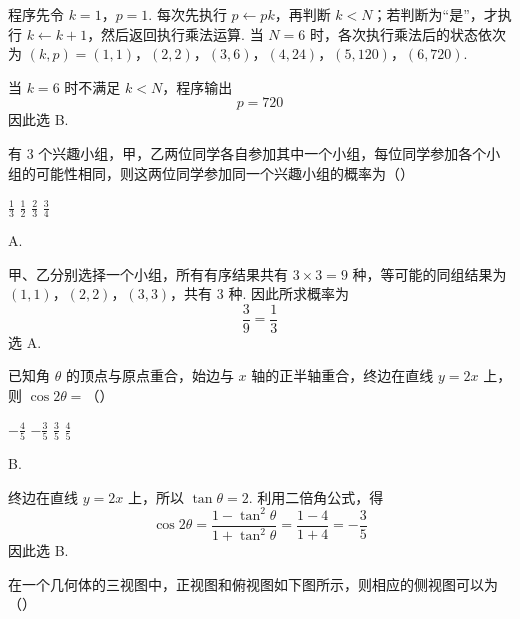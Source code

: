 \begin{solution}
程序先令 \(k=1\)，\(p=1\). 每次先执行 \(p\leftarrow pk\)，再判断 \(k<N\)；若判断为“是”，才执行 \(k\leftarrow k+1\)，然后返回执行乘法运算. 当 \(N=6\) 时，各次执行乘法后的状态依次为
\((k,p)=(1,1)\)，\((2,2)\)，\((3,6)\)，\((4,24)\)，\((5,120)\)，\((6,720)\).

当 \(k=6\) 时不满足 \(k<N\)，程序输出
\[
p=720
\]
因此选 B.
\end{solution}

\begin{problem}
有 \(3\) 个兴趣小组，甲，乙两位同学各自参加其中一个小组，每位同学参加各个小组的可能性相同，则这两位同学参加同一个兴趣小组的概率为（\quad）

\choices
    {\(\frac{1}{3}\)}
    {\(\frac{1}{2}\)}
    {\(\frac{2}{3}\)}
    {\(\frac{3}{4}\)}
\end{problem}

\begin{answer}
A.
\end{answer}

\begin{solution}
甲、乙分别选择一个小组，所有有序结果共有 \(3\times3=9\) 种，等可能的同组结果为 \((1,1)\)，\((2,2)\)，\((3,3)\)，共有 \(3\) 种. 因此所求概率为
\[
\frac{3}{9}=\frac{1}{3}
\]
选 A.
\end{solution}

\begin{problem}
已知角 \(\theta\) 的顶点与原点重合，始边与 \(x\) 轴的正半轴重合，终边在直线 \(y = 2x\) 上，则 \(\cos 2\theta =\)（\quad）

\choices
    {\(-\frac{4}{5}\)}
    {\(-\frac{3}{5}\)}
    {\(\frac{3}{5}\)}
    {\(\frac{4}{5}\)}
\end{problem}

\begin{answer}
B.
\end{answer}

\begin{solution}
终边在直线 \(y=2x\) 上，所以 \(\tan\theta=2\). 利用二倍角公式，得
\[
\cos2\theta=\frac{1-\tan^{2}\theta}{1+\tan^{2}\theta}
=\frac{1-4}{1+4}=-\frac35
\]
因此选 B.
\end{solution}

\begin{problem}
在一个几何体的三视图中，正视图和俯视图如下图所示，则相应的侧视图可以为（\quad）


    {}
    {}
    {}
\end{problem}

